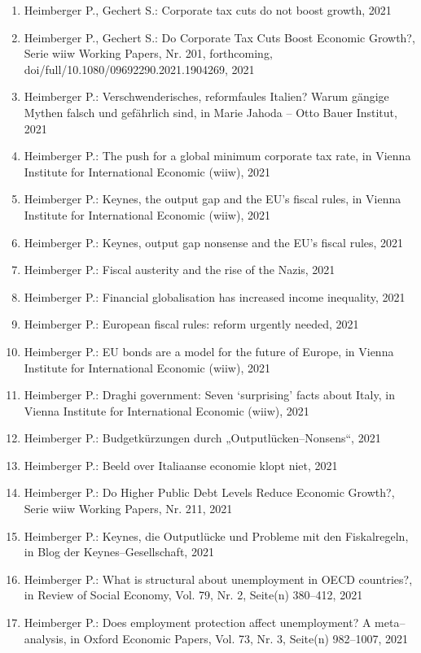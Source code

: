 \begin{enumerate}
	 \item Heimberger P., Gechert S.: Corporate tax cuts do not boost growth, 2021
	 \item Heimberger P., Gechert S.: Do Corporate Tax Cuts Boost Economic Growth?, Serie wiiw Working Papers, Nr. 201, forthcoming, doi/full/10.1080/09692290.2021.1904269, 2021
	 \item Heimberger P.: Verschwenderisches, reformfaules Italien? Warum gängige Mythen falsch und gefährlich sind, in Marie Jahoda – Otto Bauer Institut, 2021
	 \item Heimberger P.: The push for a global minimum corporate tax rate, in Vienna Institute for International Economic (wiiw), 2021
	 \item Heimberger P.: Keynes, the output gap and the EU’s fiscal rules, in Vienna Institute for International Economic (wiiw), 2021
	 \item Heimberger P.: Keynes, output gap nonsense and the EU’s fiscal rules, 2021
	 \item Heimberger P.: Fiscal austerity and the rise of the Nazis, 2021
	 \item Heimberger P.: Financial globalisation has increased income inequality, 2021
	 \item Heimberger P.: European fiscal rules: reform urgently needed, 2021
	 \item Heimberger P.: EU bonds are a model for the future of Europe, in Vienna Institute for International Economic (wiiw), 2021
	 \item Heimberger P.: Draghi government: Seven ‘surprising’ facts about Italy, in Vienna Institute for International Economic (wiiw), 2021
	 \item Heimberger P.: Budgetkürzungen durch „Outputlücken--Nonsens“, 2021
	 \item Heimberger P.: Beeld over Italiaanse economie klopt niet, 2021
	 \item Heimberger P.: Do Higher Public Debt Levels Reduce Economic Growth?, Serie wiiw Working Papers, Nr. 211, 2021
	 \item Heimberger P.: Keynes, die Outputlücke und Probleme mit den Fiskalregeln, in Blog der Keynes--Gesellschaft, 2021
	 \item Heimberger P.: What is structural about unemployment in OECD countries?, in Review of Social Economy, Vol. 79, Nr. 2, Seite(n) 380--412, 2021
	 \item Heimberger P.: Does employment protection affect unemployment? A meta--analysis, in Oxford Economic Papers, Vol. 73, Nr. 3, Seite(n) 982--1007, 2021

\end{enumerate}

